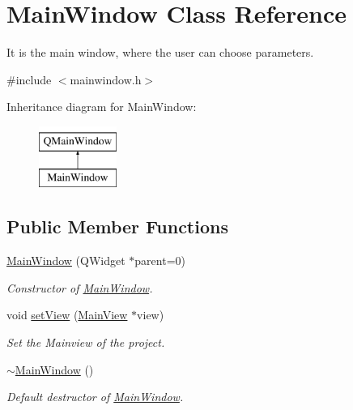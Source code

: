 \hypertarget{class_main_window}{}\section{Main\+Window Class Reference}
\label{class_main_window}


It is the main window, where the user can choose parameters.  




{\ttfamily \#include $<$mainwindow.\+h$>$}

Inheritance diagram for Main\+Window\+:\begin{figure}[H]
\begin{center}
\leavevmode
\includegraphics[height=2.000000cm]{class_main_window}
\end{center}
\end{figure}
\subsection*{Public Member Functions}
\begin{DoxyCompactItemize}
\item 
\hyperlink{class_main_window_a8b244be8b7b7db1b08de2a2acb9409db}{Main\+Window} (Q\+Widget $\ast$parent=0)
\begin{DoxyCompactList}\small\item\em Constructor of \hyperlink{class_main_window}{Main\+Window}. \end{DoxyCompactList}\item 
void \hyperlink{class_main_window_adffbce021ec28108d1b1893bf43da5e0}{set\+View} (\hyperlink{class_main_view}{Main\+View} $\ast$view)
\begin{DoxyCompactList}\small\item\em Set the Mainview of the project. \end{DoxyCompactList}\item 
\hyperlink{class_main_window_ae98d00a93bc118200eeef9f9bba1dba7}{$\sim$\+Main\+Window} ()
\begin{DoxyCompactList}\small\item\em Default destructor of \hyperlink{class_main_window}{Main\+Window}. \end{DoxyCompactList}\end{DoxyCompactItemize}


